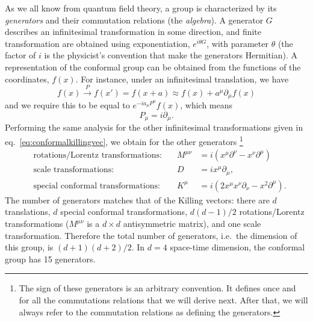 \documentclass[a4paper,12pt]{article}
\numberwithin{equation}{section}
\begin{document}
As we all know from quantum field theory, a group is characterized by its \emph{generators} and their commutation relations (the \emph{algebra}). A generator $G$ describes an infinitesimal transformation in some direction, and finite transformation are obtained using exponentiation, $e^{i \theta G}$, with parameter $\theta$ (the factor of $i$ is the physicist's convention that make the generators Hermitian).
A representation of the conformal group can be obtained from the functions of the coordinates, $f(x)$. For instance, under an infinitesimal translation, we have
\begin{equation}
	f(x) \xrightarrow{P} f(x') = f(x + a) \approx f(x)
	+ a^\mu \partial_\mu f(x)
\end{equation}
and we require this to be equal to $e^{-i a_\mu P^\mu} f(x)$, which means
\begin{equation}
	P_\mu = i \partial_\mu.
	\label{eq:P:fcts}
\end{equation}
Performing the same analysis for the other infinitesimal transformations given in eq.~\eqref{eq:conformalkillingvec}, we obtain for the other generators%
%
\footnote{The sign of these generators is an arbitrary convention. It defines once and for all the commutations relations that we will derive next. After that, we will always refer to the commutation relations as defining the generators.}
\begin{align}
	& \text{rotations/Lorentz transformations:} \quad &
	M^{\mu\nu} &= i \left( x^\mu \partial^\nu
	- x^\nu \partial^\mu \right)
	\label{eq:M:fcts}
	\\
	& \text{scale transformations:} & 
	D &= i x^\mu \partial_\mu,
	\label{eq:D:fcts}
	\\
	& \text{special conformal transformations:} &
	K^\mu &= i \left( 2 x^\mu x^\nu \partial_\nu 
	- x^2 \partial^\mu \right).
	\label{eq:K:fcts}
\end{align}
The number of generators matches that of the Killing vectors: there are $d$ translations, $d$ special conformal transformations, $d (d-1)/2$ rotations/Lorentz transformations ($M^{\mu\nu}$ is a $d \times d$ antisymmetric matrix), and one scale transformation.
Therefore the total number of generators, i.e.~the dimension of this group, is $(d + 1)(d + 2)/2$. In $d = 4$ space-time dimension, the conformal group has 15 generators.
\end{document}
